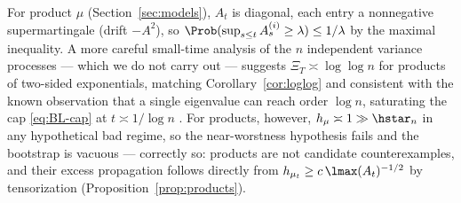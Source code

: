 \documentclass[../../main.tex]{subfiles}
\begin{document}
\begin{remark}
\label{rem:products-bootstrap}
For product $\mu$ (Section~\ref{sec:models}), $A_t$ is diagonal, each entry a nonnegative
supermartingale (drift $-A^2$), so $\Prob(\sup_{s\le t}A^{(i)}_s\ge\lambda)\le1/\lambda$ by the
maximal inequality. A more careful small-time analysis of the $n$ independent variance
processes --- which we do not carry out --- suggests $\Xi_T\asymp\log\log n$ for products of
two-sided exponentials, matching Corollary~\ref{cor:loglog} and consistent with the known
observation that a single eigenvalue can reach order $\log n$, saturating the cap
\eqref{eq:BL-cap} at $t\asymp1/\log n$ \cite{Chen2021,KlartagLehec2022Polylog}. For products,
however, $h_\mu\asymp1\gg\hstar_n$ in any hypothetical bad regime, so the near-worstness
hypothesis fails and the bootstrap is vacuous --- correctly so: products are not candidate
counterexamples, and their excess propagation follows directly from
$h_{\mu_t}\ge c\,\lmax(A_t)^{-1/2}$ by tensorization (Proposition~\ref{prop:products}).
\end{remark}
\end{document}
